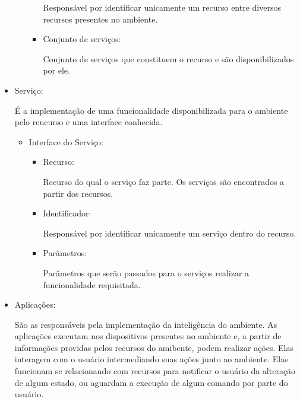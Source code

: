 \begin{itemize}
\begin{itemize}
\begin{itemize}
						Responsável por identificar unicamente um recurso entre diversos recursos presentes no ambiente.
					\item Conjunto de serviços:

						Conjunto de serviços que constituem o recurso e são disponibilizados por ele.
				\end{itemize}
		\end{itemize}
	\item Serviço:

		É a implementação de uma funcionalidade disponibilizada para o ambiente pelo reucurso e uma interface conhecida.
		\begin{itemize}
			\item Interface do Serviço:
			\begin{itemize}
				\item Recurso:

					Recurso do qual o serviço faz parte. Os serviços são encontrados a partir dos recursos.
				\item Identificador:

					Responsável por identificar unicamente um serviço dentro do recurso.
				\item Parâmetros:

					Parâmetros que serão passados para o serviços realizar a funcionalidade requisitada.
			\end{itemize}
		\end{itemize}
	\item Aplicações:
	
		São as responsáveis pela implementação da inteligência do ambiente. As aplicações executam nos dispositivos presentes no ambiente e, a partir de informações providas pelos recursos do amibente, podem realizar ações. Elas interagem com o usuário intermediando suas ações junto ao ambiente. Elas funcionam se relacionando com recursos para notificar o usuário da alteração de algum estado, ou aguardam a execução de algum comando por parte do usuário.
\end{itemize}
